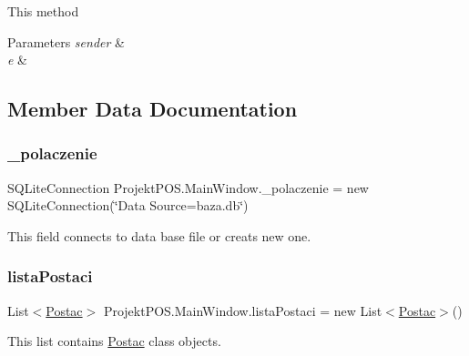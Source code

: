 This method 


\begin{DoxyParams}{Parameters}
{\em sender} & \\
\hline
{\em e} & \\
\hline
\end{DoxyParams}


\subsection{Member Data Documentation}
\mbox{\label{class_projekt_p_o_s_1_1_main_window_a9b68fbebcc348b5a1d0a0370d1180ba6}} 
\subsubsection{\texorpdfstring{\+\_\+polaczenie}{\_polaczenie}}
{\footnotesize\ttfamily S\+Q\+Lite\+Connection Projekt\+P\+O\+S.\+Main\+Window.\+\_\+polaczenie = new S\+Q\+Lite\+Connection(\char`\"{}Data Source=baza.\+db\char`\"{})\hspace{0.3cm}{\ttfamily [private]}}



This field connects to data base file or creats new one. 

\mbox{\label{class_projekt_p_o_s_1_1_main_window_abe462d9c2e721c3476d858fb870fa4b4}} 
\subsubsection{\texorpdfstring{lista\+Postaci}{listaPostaci}}
{\footnotesize\ttfamily List$<$\hyperlink{class_projekt_p_o_s_1_1_postac}{Postac}$>$ Projekt\+P\+O\+S.\+Main\+Window.\+lista\+Postaci = new List$<$\hyperlink{class_projekt_p_o_s_1_1_postac}{Postac}$>$()\hspace{0.3cm}{\ttfamily [private]}}



This list contains \hyperlink{class_projekt_p_o_s_1_1_postac}{Postac} class objects. 

